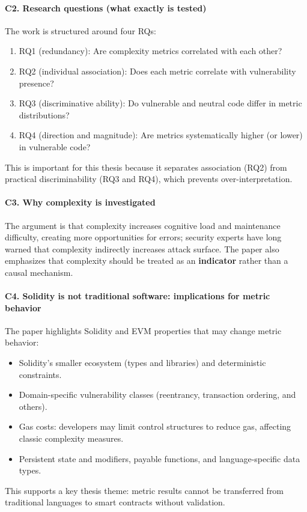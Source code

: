 \documentclass[11pt,a4paper]{article}
\begin{document}
\paragraph{C2. Research questions (what exactly is tested)}
The work is structured around four RQs:
\begin{enumerate}[leftmargin=*]
  \item RQ1 (redundancy): Are complexity metrics correlated with each other?
  \item RQ2 (individual association): Does each metric correlate with vulnerability presence?
  \item RQ3 (discriminative ability): Do vulnerable and neutral code differ in metric distributions?
  \item RQ4 (direction and magnitude): Are metrics systematically higher (or lower) in vulnerable code?
\end{enumerate}
This is important for this thesis because it separates association (RQ2) from practical discriminability (RQ3 and RQ4), which prevents over-interpretation.

\paragraph{C3. Why complexity is investigated}
The argument is that complexity increases cognitive load and maintenance difficulty, creating more opportunities for errors; security experts have long warned that complexity indirectly increases attack surface. The paper also emphasizes that complexity should be treated as an \textbf{indicator} rather than a causal mechanism.

\paragraph{C4. Solidity is not traditional software: implications for metric behavior}
The paper highlights Solidity and EVM properties that may change metric behavior:
\begin{itemize}[leftmargin=*]
  \item Solidity's smaller ecosystem (types and libraries) and deterministic constraints.
  \item Domain-specific vulnerability classes (reentrancy, transaction ordering, and others).
  \item Gas costs: developers may limit control structures to reduce gas, affecting classic complexity measures.
  \item Persistent state and modifiers, payable functions, and language-specific data types.
\end{itemize}
This supports a key thesis theme: metric results cannot be transferred from traditional languages to smart contracts without validation.
\end{document}
